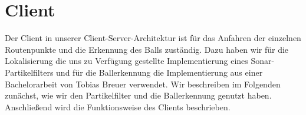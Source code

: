 \section{Client}
\label{sec:client}
Der Client in unserer Client-Server-Architektur ist für das Anfahren der
einzelnen Routenpunkte und die Erkennung des Balls zuständig. Dazu haben
wir für die Lokalisierung die uns zu Verfügung gestellte Implementierung
eines Sonar-Partikelfilters und für die Ballerkennung die Implementierung
aus einer Bachelorarbeit von Tobias Breuer verwendet. Wir beschreiben
im Folgenden zunächst, wie wir den Partikelfilter und die
Ballerkennung genutzt haben. Anschließend wird die Funktionsweise des
Clients beschrieben.








